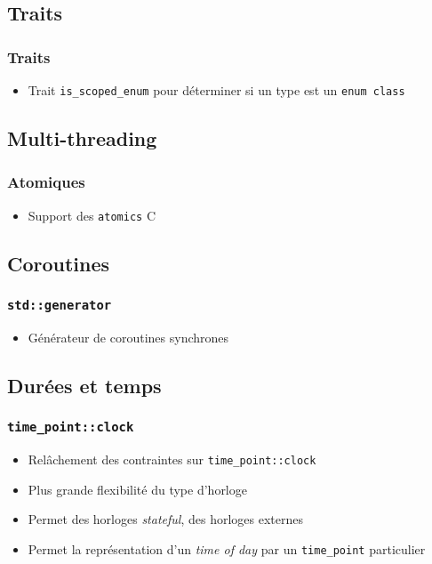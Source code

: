 \documentclass[C++.tex]{subfiles}
\begin{document}
\subsection*{Traits}
\begin{frame}[fragile]
	\frametitle{Traits}
	\begin{itemize}
		\item Trait \lstinline|is_scoped_enum| pour déterminer si un type est un \lstinline|enum class|
	\end{itemize}
\end{frame}

\subsection*{Multi-threading}
\begin{frame}[fragile]
	\frametitle{Atomiques}
	\begin{itemize}
		\item Support des \lstinline|atomics| C
	\end{itemize}
\end{frame}

\subsection*{Coroutines}
\begin{frame}[fragile]
	\frametitle{\lstinline|std::generator|}
	\begin{itemize}
		\item Générateur de coroutines synchrones
	\end{itemize}
\end{frame}


\subsection*{Durées et temps}
\begin{frame}[fragile]
	\frametitle{\lstinline|time_point::clock|}
	\begin{itemize}
		\item Relâchement des contraintes sur \lstinline|time_point::clock|
		\item Plus grande flexibilité du type d'horloge
		\item Permet des horloges \textit{stateful}, des horloges externes
		\item Permet la représentation d'un \textit{time of day} par un \lstinline|time_point| particulier
	\end{itemize}
\end{frame}
\end{document}
